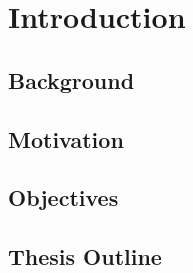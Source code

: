 \chapter{Introduction}
\section{Background}
\lipsum[1]

\section{Motivation}
\lipsum[2]

\section{Objectives}
\lipsum[3]

\section{Thesis Outline}
\lipsum[4]
